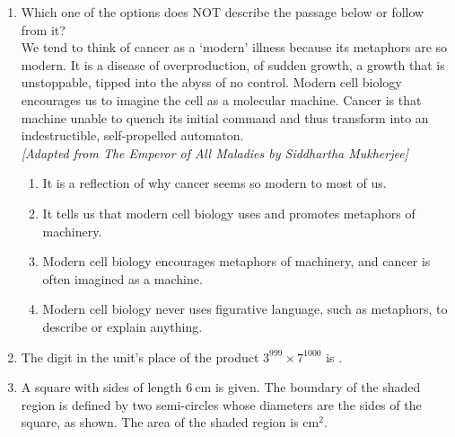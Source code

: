 \documentclass[journal,12pt,onecolumn]{IEEEtran}
\theoremstyle{remark}
\begin{document}
\begin{enumerate}
\begin{enumerate}
\end{enumerate}
\hfill{}
\item Which one of the options does NOT describe the passage below or follow from it? \\[0.5em]
We tend to think of cancer as a `modern' illness because its metaphors are so modern. It is a disease of overproduction, of sudden growth, a growth that is unstoppable, tipped into the abyss of no control. Modern cell biology encourages us to imagine the cell as a molecular machine. Cancer is that machine unable to quench its initial command  and thus transform into an indestructible, self-propelled automaton. \\[0.5em]
\textit{[Adapted from The Emperor of All Maladies by Siddhartha Mukherjee]} \\[0.5em]

\begin{enumerate}
\item It is a reflection of why cancer seems so modern to most of us.
\item It tells us that modern cell biology uses and promotes metaphors of machinery.
\item Modern cell biology encourages metaphors of machinery, and cancer is often imagined as a machine.
\item Modern cell biology never uses figurative language, such as metaphors, to describe or explain anything.
\end{enumerate}
\hfill{}

\newpage

\item The digit in the unit's place of the product $3^{999} \times 7^{1000}$ is \underline{\hspace{1cm}}. 

\begin{enumerate}
\end{enumerate}
\hfill{}
\item A square with sides of length $6 \ \text{cm}$ is given. The boundary of the shaded region is defined by two semi-circles whose diameters are the sides of the square, as shown. The area of the shaded region is \underline{\hspace{1cm}} $\text{cm}^2$. 


\end{enumerate}
\end{document}
